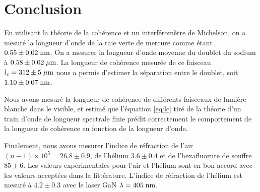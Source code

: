 \documentclass[10pt,letterpaper,twocolumn]{article}
\newcommand{\s}{\hspace{0.1cm}}
\begin{document}
\section{Conclusion}\label{sec:conclusion} %
En utilisant la théorie de la cohérence et un interféromètre de Michelson, on a mesuré la longueur d'onde de la raie verte de mercure comme étant ${0.55 \pm 0.02\s \text{nm}}$. On a mesurer la longueur d'onde moyenne du doublet du sodium à ${0.58 \pm 0.02 \s \mu\text{m}}$. La longueur de cohérence mesurée de ce faisceau $l_c = 312 \pm 5\s \mu \text{m}$ nous a permis d'estimer la séparation entre le doublet, soit $1.10 \pm 0.07\s \text{nm}$. \par
Nous avons mesuré la longueur de cohérence de différents faisceaux de lumière blanche dans le visible, et estimé que l'équation \eqref{eq:lc} tiré de la théorie d'un train d'onde de longueur spectrale finie prédit correctement le comportement de la longueur de cohérence en fonction de la longueur d'onde. \par
Finalement, nous avons mesurer l'indice de réfraction de l'air $(n - 1)\times 10^5 = 26.8 \pm 0.9$, de l'hélium $3.6 \pm 0.4$ et de l'hexafluorure de souffre  $85 \pm 6$. Les valeurs expérimentales pour l'air et l'hélium sont en bon accord avec les valeurs acceptées dans la littérature. L'indice de réfraction de l'hélium est mesuré à $4.2 \pm 0.3$ avec le laser GaN $\lambda = 405\s \text{nm}$. 
\printbibliography
\end{document}
